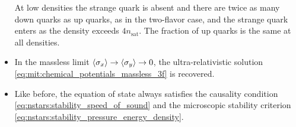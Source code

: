 \begin{itemize}
      At low densities the strange quark is absent and there are twice as many down quarks as up quarks, as in the two-flavor case,
      and the strange quark enters as the density exceeds $4 n_\text{sat}$.
      The fraction of up quarks is the same at all densities.
\item In the massless limit $\langle \sigma_x \rangle \rightarrow \langle \sigma_y \rangle \rightarrow 0$, the ultra-relativistic solution \eqref{eq:mit:chemical_potentials_massless_3f} is recovered.
\item Like before, the equation of state always satisfies the causality condition \eqref{eq:nstars:stability_speed_of_sound}
      and the microscopic stability criterion \eqref{eq:nstars:stability_pressure_energy_density}.
\end{itemize}

